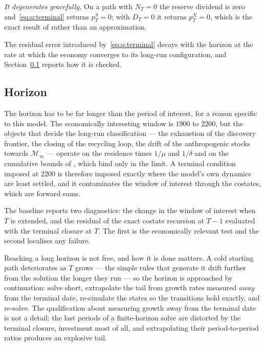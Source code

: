 \emph{It degenerates gracefully.} On a path with $N_T=0$ the reserve dividend is zero and~\eqref{eq:q:terminal} returns $p^S_T=0$; with $D_T=0$ it returns $p^X_T=0$, which is the exact result of  rather than an approximation.

The residual error introduced by~\eqref{eq:q:terminal} decays with the horizon at the rate at which the economy converges to its long-run configuration, and Section~\ref{sec:q:sol:horizon} reports how it is checked.

\subsection{Horizon}\label{sec:q:sol:horizon}

The horizon has to be far longer than the period of interest, for a reason specific to this model. The economically interesting window is $1900$ to $2200$, but the objects that decide the long-run classification --- the exhaustion of the discovery frontier, the closing of the recycling loop, the drift of the anthropogenic stocks towards $\mathcal M_\infty$ --- operate on the residence times $1/\mu$ and $1/\delta$ and on the cumulative bounds of , which bind only in the limit. A terminal condition imposed at $2200$ is therefore imposed exactly where the model's own dynamics are least settled, and it contaminates the window of interest through the costates, which are forward sums.

The baseline reports two diagnostics: the change in the window of interest when $T$ is extended, and the residual of the exact costate recursion at $T-1$ evaluated with the terminal closure at $T$. The first is the economically relevant test and the second localises any failure.

Reaching a long horizon is not free, and how it is done matters. A cold starting path deteriorates as $T$ grows --- the simple rules that generate it drift further from the solution the longer they run --- so the horizon is approached by continuation: solve short, extrapolate the tail from growth rates measured \emph{away} from the terminal date, re-simulate the states so the transitions hold exactly, and re-solve. The qualification about measuring growth away from the terminal date is not a detail: the last periods of a finite-horizon solve are distorted by the terminal closure, investment most of all, and extrapolating their period-to-period ratios produces an explosive tail.

